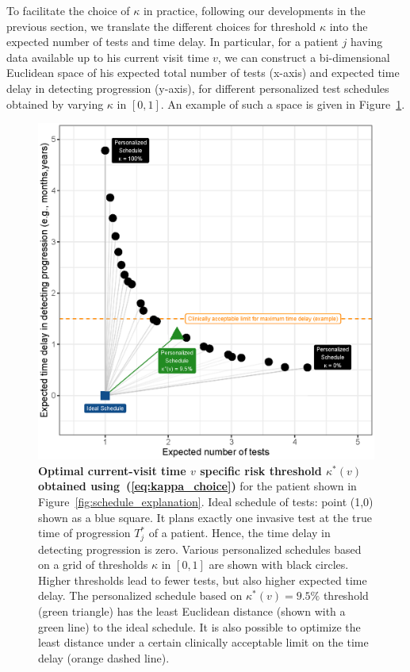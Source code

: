 \documentclass[useAMS, usenatbib, referee]{biom}
\begin{document}
To facilitate the choice of $\kappa$ in practice, following our developments in the previous section, we translate the different choices for threshold $\kappa$ into the expected number of tests and time delay. In particular, for a patient $j$ having data available up to his current visit time $v$, we can construct a bi-dimensional Euclidean space of his expected total number of tests (x-axis) and expected time delay in detecting progression (y-axis), for different personalized test schedules obtained by varying $\kappa$ in $[0, 1]$. An example of such a space is given in Figure~\ref{fig:kappa_choice}.
\begin{figure}
\centerline{\includegraphics{kappa_choice_102.eps}}
\caption{\textbf{Optimal current-visit time $v$ specific risk threshold $\kappa^*(v)$ obtained using~(\ref{eq:kappa_choice})} for the patient shown in Figure~\ref{fig:schedule_explanation}. Ideal schedule of tests: point (1,0) shown as a blue square. It plans exactly one invasive test at the true time of progression $T^*_j$ of a patient. Hence, the time delay in detecting progression is zero. Various personalized schedules based on a grid of thresholds $\kappa$ in $[0,1]$ are shown with black circles. Higher thresholds lead to fewer tests, but also higher expected time delay. The personalized schedule based on $\kappa^*(v)=9.5\%$ threshold (green triangle) has the least Euclidean distance (shown with a green line) to the ideal schedule. It is also possible to optimize the least distance under a certain clinically acceptable limit on the time delay (orange dashed line).}
\label{fig:kappa_choice}
\end{figure}
\end{document}
